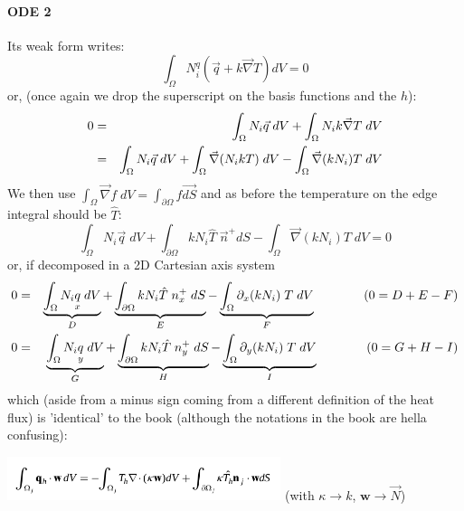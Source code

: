 \paragraph{ODE 2} Its weak form writes:
\[
\int_\Omega N_i^q (\vec{q} + k\vec{\nabla } T ) dV = 0
\]
or, (once again we drop the superscript on the basis functions and the $h$): 
\begin{eqnarray}
0 &=& \int_\Omega N_i \vec{q} \;  dV + \int_\Omega N_i k\vec{\nabla } T \; dV \nonumber\\
&=& \int_\Omega N_i \vec{q} \;  dV + \int_\Omega \vec\nabla (N_i k  T) \; dV 
- \int_\Omega \vec\nabla (k N_i) T \; dV
\end{eqnarray}
We then use $\int_\Omega \vec\nabla f \; dV = \int_{\partial\Omega} f \vec{dS}$
and as before the temperature on the edge integral should be $\hat{T}$:
\[
\int_\Omega N_i \vec{q} \;  dV + \int_{\partial\Omega}  k N_i \hat{T} \; \vec{n}^+  dS - \int_\Omega \vec\nabla (k N_i)   T \; dV = 0
\]
or, if decomposed in a 2D Cartesian axis system 
\begin{eqnarray}
0
&=& \underbrace{ \int_\Omega N_i  \underset{\tiny x}{q} \; dV }_{D}
+\underbrace{\int_{\partial\Omega} k N_i \hat{T} \; n^+_x \; dS}_{E}
-\underbrace{\int_\Omega \partial_x ( k N_i) \;  T \; dV}_{F} \qquad\qquad  (0=D+E-F)\nonumber\\
0
&=&\underbrace{\int_\Omega N_i  \underset{\tiny y}{q} \; dV}_G 
+\underbrace{\int_{\partial\Omega} k N_i  \hat{T} \; n^+_y \; dS }_{H}
-\underbrace{\int_\Omega \partial_y (k N_i) \;  T \; dV}_I \qquad\qquad  (0=G+H-I)
\end{eqnarray}
which (aside from a minus sign coming from a different definition of the heat flux) is 'identical' to the book
(although the notations in the book are hella confusing):
\begin{center}
\includegraphics[width=8cm]{images/dgfem/li_02} (with $\kappa \rightarrow k$, ${\bm w}\rightarrow \vec{N}$)
\end{center}

